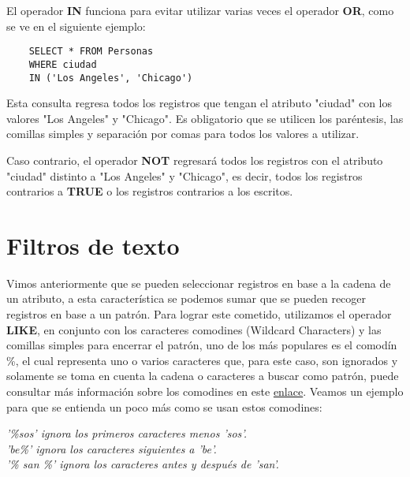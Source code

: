 El operador \textbf{IN} funciona para evitar utilizar varias veces el operador \textbf{OR}, como se ve en el siguiente ejemplo:
\begin{lstlisting}
    SELECT * FROM Personas
    WHERE ciudad
    IN ('Los Angeles', 'Chicago')
\end{lstlisting}

Esta consulta regresa todos los registros que tengan el atributo "ciudad" con los valores "Los Angeles" y "Chicago". Es obligatorio que se utilicen los paréntesis, las comillas simples y separación por comas para todos los valores a utilizar.

Caso contrario, el operador \textbf{NOT} regresará todos los registros con el atributo "ciudad" distinto a "Los Angeles" y "Chicago", es decir, todos los registros contrarios a \textbf{TRUE} o los registros contrarios a los escritos.



\section{Filtros de texto}

Vimos anteriormente que se pueden seleccionar registros en base a la cadena de un atributo, a esta característica se podemos sumar que se pueden recoger registros en base a un patrón. Para lograr este cometido, utilizamos el operador \textbf{LIKE}, en conjunto con los caracteres comodines (Wildcard Characters) y las comillas simples para encerrar el patrón, uno de los más populares es el comodín \%, el cual representa uno o varios caracteres que, para este caso, son ignorados y solamente se toma en cuenta la cadena o caracteres a buscar como patrón, puede consultar más información sobre los comodines en este \href{https://www.w3schools.com/sql/sql_wildcards.asp}{enlace}. Veamos un ejemplo para que se entienda un poco más como se usan estos comodines:
\begin{center}
    \textit{
        '\%sos' ignora los primeros caracteres menos 'sos'. \\
        'be\%' ignora los caracteres siguientes a 'be'. \\
        '\% san \%' ignora los caracteres antes y después de 'san'.
    }
\end{center}

